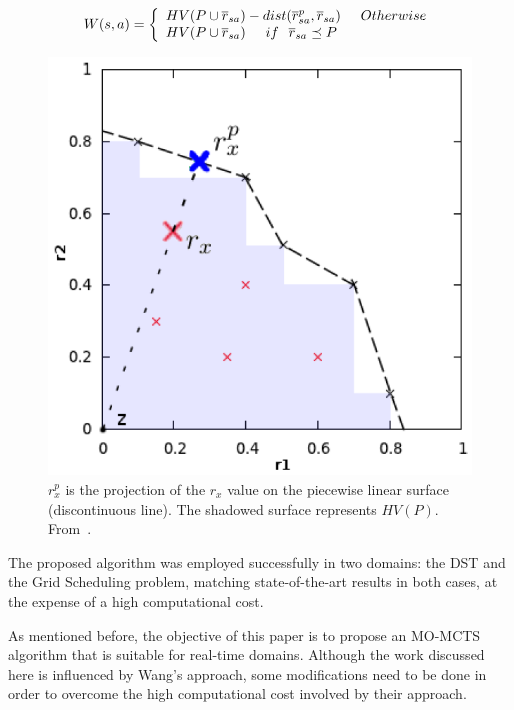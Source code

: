 \documentclass[journal]{IEEEtran}
\begin{document}
\begin{equation} \label{eq:wang}
	W(s,a) = \left\{
\begin{array}{l l}      
    HV(P \cup \overline{r}_{sa}) - dist(\overline{r}^p_{sa}, \overline{r}_{sa} )\hspace{0.5cm} Otherwise \\
    HV(P \cup \overline{r}_{sa}) \hspace{0.5cm} if \hspace{0.25cm} \overline{r}_{sa} \preceq P\\
\end{array}\right.
\end{equation}


\begin{figure}[!t]
\begin{center}
\includegraphics[width=0.65\columnwidth]{img/wangHV}
\end{center}
\caption{$r^p_x$ is the projection of the $r_x$ value on the piecewise linear surface (discontinuous line). The shadowed surface represents $HV(P)$. From~\cite{Weijia2012}.}
\label{fig:wangHV}
\end{figure}
 
The proposed algorithm was employed successfully in two domains: the DST and the Grid Scheduling problem, matching state-of-the-art results in both cases, at the expense of a high computational cost.

As mentioned before, the objective of this paper is to propose an MO-MCTS algorithm that is suitable for real-time domains. Although the work discussed here is influenced by Wang's approach, some modifications need to be done in order to overcome the high computational cost involved by their approach.
\end{document}
